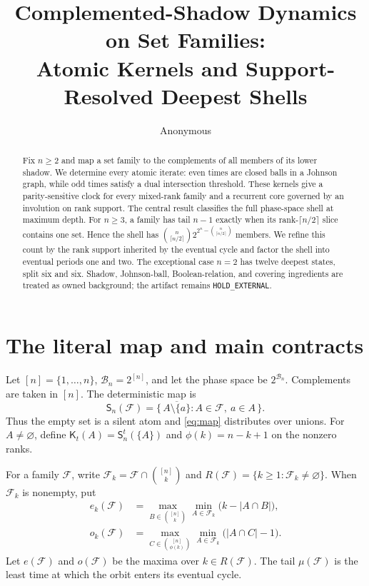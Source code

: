 \documentclass[a4paper,10pt]{amsart}
\title[Complemented-Shadow Dynamics]{Complemented-Shadow Dynamics on Set Families:\\
Atomic Kernels and Support-Resolved Deepest Shells}
\author{Anonymous}
\date{}
\newcommand{\cB}{\mathcal B}
\newcommand{\cF}{\mathcal F}
\newcommand{\cS}{\mathsf S}
\newcommand{\cK}{\mathsf K}
\begin{document}
\begin{abstract}
Fix $n\geq2$ and map a set family to the complements of all members of its
lower shadow.  We determine every atomic iterate: even times are closed balls
in a Johnson graph, while odd times satisfy a dual intersection threshold.
These kernels give a parity-sensitive clock for every mixed-rank family and a
recurrent core governed by an involution on rank support.  The central result
classifies the full phase-space shell at maximum depth.  For $n\geq3$, a
family has tail $n-1$ exactly when its rank-$\lceil n/2\rceil$ slice contains
one set.  Hence the shell has
$\binom{n}{\lceil n/2\rceil}2^{2^n-\binom{n}{\lceil n/2\rceil}}$ members.  We
refine this count by the rank support inherited by the eventual cycle and
factor the shell into eventual periods one and two.  The exceptional case
$n=2$ has twelve deepest states, split six and six.  Shadow, Johnson-ball,
Boolean-relation, and covering ingredients are treated as owned background;
the artifact remains \texttt{HOLD\_EXTERNAL}.
\end{abstract}

\maketitle

\section{The literal map and main contracts}

Let $[n]=\{1,\ldots,n\}$, $\cB_n=2^{[n]}$, and let the phase space be
$2^{\cB_n}$.  Complements are taken in $[n]$.  The deterministic map is
\begin{equation}\label{eq:map}
 \cS_n(\cF)=
 \{\,\overline{A\setminus\{a\}}:A\in\cF,\ a\in A\,\}.
\end{equation}
Thus the empty set is a silent atom and \eqref{eq:map} distributes over
unions.  For $A\neq\varnothing$, define
$\cK_t(A)=\cS_n^t(\{A\})$ and $\phi(k)=n-k+1$ on the nonzero ranks.

For a family $\cF$, write
$\cF_k=\cF\cap\binom{[n]}k$ and
$R(\cF)=\{k\geq1:\cF_k\neq\varnothing\}$.  When $\cF_k$ is nonempty, put
\begin{align}
 e_k(\cF)&=\max_{B\in\binom{[n]}k}\min_{A\in\cF_k}
   \bigl(k-|A\cap B|\bigr),\label{eq:e}\\
 o_k(\cF)&=\max_{C\in\binom{[n]}{\phi(k)}}\min_{A\in\cF_k}
   \bigl(|A\cap C|-1\bigr).\label{eq:o}
\end{align}
Let $e(\cF)$ and $o(\cF)$ be the maxima over $k\in R(\cF)$.  The tail
$\mu(\cF)$ is the least time at which the orbit enters its eventual cycle.
\end{document}
